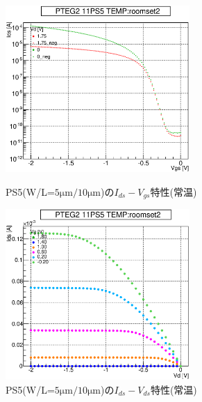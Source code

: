 				\begin{figure}[htbp]
					\begin{minipage}{0.5\hsize}
						\begin{center}
							\includegraphics[width=70mm]{./Chapter/Appendix/Picture/PST/PS5/PTEG2_11_PS5_IdVg_roomset2.eps}
						\end{center}
						\caption{PS5(W/L=$5\mathrm{\mu m}/10\mathrm{\mu m}$)の$I_{ds}-V_{gs}$特性(常温)}
						\label{fig:PS5_IdVg_room}
					\end{minipage}
					\begin{minipage}{0.5\hsize}
						\begin{center}
							\includegraphics[width=70mm]{./Chapter/Appendix/Picture/PST/PS5/PTEG2_11_PS5_IdVd_roomset2.eps}
						\end{center}
						\caption{PS5(W/L=$5\mathrm{\mu m}/10\mathrm{\mu m}$)の$I_{ds}-V_{ds}$特性(常温)}
						\label{fig:PS5_IdVd_room}
					\end{minipage}
				\end{figure}
